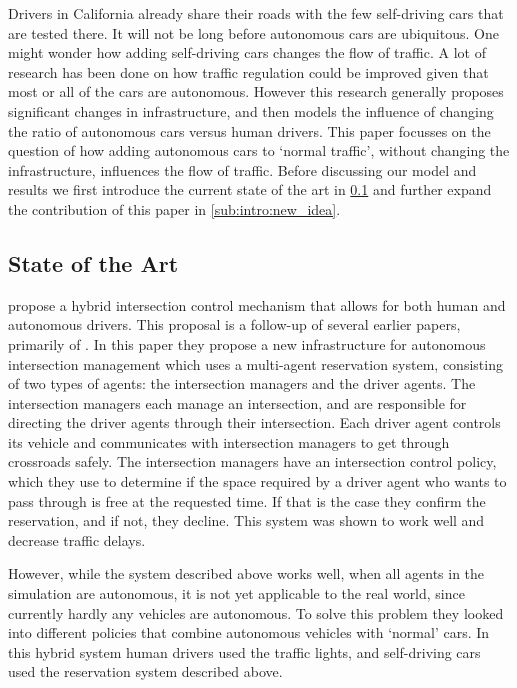 Drivers in California already share their roads with the few self-driving cars that are tested there. It will not be long before autonomous cars are ubiquitous. One might wonder how adding self-driving cars changes the flow of traffic. A lot of research has been done on how traffic regulation could be improved given that most or all of the cars are autonomous. However this research generally proposes significant changes in infrastructure, and then models the influence of changing the ratio of autonomous cars versus human drivers. This paper focusses on the question of how adding autonomous cars to `normal traffic', without changing the infrastructure, influences the flow of traffic. Before discussing our model and results we first introduce the current state of the art in \cref{sub:intro:state_of_the_art} and further expand the contribution of this paper in \cref{sub:intro:new_idea}.

\subsection{State of the Art}
\label{sub:intro:state_of_the_art}
\textcite{dresner2007sharing} propose a hybrid intersection control mechanism that allows for both human and autonomous drivers. This proposal is a follow-up of several earlier papers, primarily of \textcite{dresner2005traffic}. In this paper they propose a new infrastructure for autonomous intersection management which uses a multi-agent reservation system, consisting of two types of agents: the intersection managers and the driver agents. The intersection managers each manage an intersection, and are responsible for directing the driver agents through their intersection. Each driver agent controls its vehicle and communicates with intersection managers to get through crossroads safely. The intersection managers have an intersection control policy, which they use to determine if the space required by a driver agent who wants to pass through is free at the requested time. If that is the case they confirm the reservation, and if not, they decline. This system was shown to work well and decrease traffic delays. 

However, while the system described above works well, when all agents in the simulation are autonomous, it is not yet applicable to the real world, since currently hardly any vehicles are autonomous. To solve this problem they looked into different policies that combine autonomous vehicles with `normal' cars. In this hybrid system human drivers used the traffic lights, and self-driving cars used the reservation system described above.

